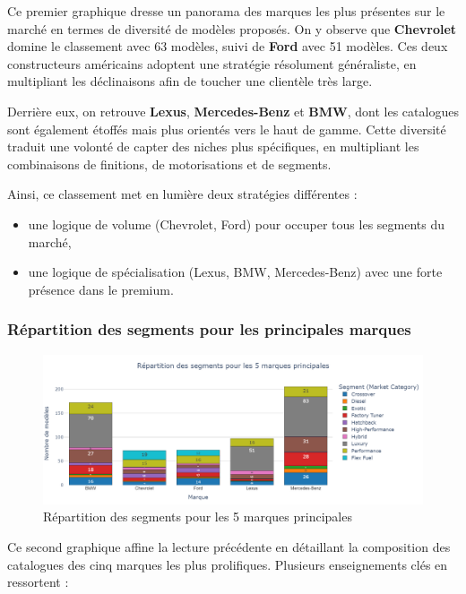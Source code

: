 \documentclass[12pt]{report}
\begin{document}
Ce premier graphique dresse un panorama des marques les plus présentes sur le marché en termes de diversité de modèles proposés. On y observe que \textbf{Chevrolet} domine le classement avec 63 modèles, suivi de \textbf{Ford} avec 51 modèles. Ces deux constructeurs américains adoptent une stratégie résolument généraliste, en multipliant les déclinaisons afin de toucher une clientèle très large.

Derrière eux, on retrouve \textbf{Lexus}, \textbf{Mercedes-Benz} et \textbf{BMW}, dont les catalogues sont également étoffés mais plus orientés vers le haut de gamme. Cette diversité traduit une volonté de capter des niches plus spécifiques, en multipliant les combinaisons de finitions, de motorisations et de segments.

Ainsi, ce classement met en lumière deux stratégies différentes : 
\begin{itemize}
    \item une logique de volume (Chevrolet, Ford) pour occuper tous les segments du marché,
    \item une logique de spécialisation (Lexus, BMW, Mercedes-Benz) avec une forte présence dans le premium.
\end{itemize}

\subsubsection{Répartition des segments pour les principales marques}

\begin{figure}[H]
    \centering
    \includegraphics[width=1\textwidth]{Marque_nbmodele.png}
    \caption{Répartition des segments pour les 5 marques principales}
    \label{fig:marque-nbmodele}
\end{figure}

Ce second graphique affine la lecture précédente en détaillant la composition des catalogues des cinq marques les plus prolifiques. Plusieurs enseignements clés en ressortent :
\end{document}

